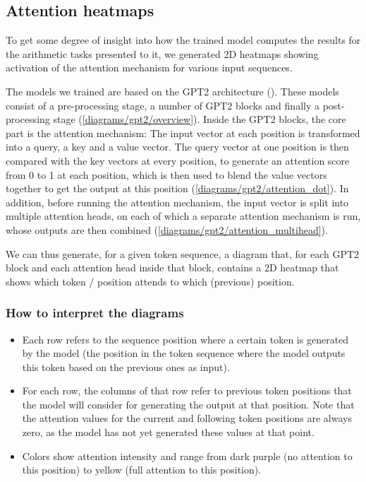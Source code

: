 \subsection{Attention heatmaps}
\label{heatmap}

To get some degree of insight into how the trained model computes the results for the arithmetic tasks presented to it, we generated 2D heatmaps showing activation of the attention mechanism for various input sequences.

The models we trained are based on the GPT2 architecture (\cite{unsupervisedmultitask}). These models consist of a pre-processing stage, a number of GPT2 blocks and finally a post-processing stage (\cref{diagrams/gpt2/overview}). Inside the GPT2 blocks, the core part is the attention mechanism: The input vector at each position is transformed into a query, a key and a value vector. The query vector at one position is then compared with the key vectors at every position, to generate an attention score from 0 to 1 at each position, which is then used to blend the value vectors together to get the output at this position (\cref{diagrams/gpt2/attention_dot}).
In addition, before running the attention mechanism, the input vector is split into multiple attention heads, on each of which a separate attention mechanism is run, whose outputs are then combined (\cref{diagrams/gpt2/attention_multihead}).

We can thus generate, for a given token sequence,
a diagram that, for each GPT2 block and each attention head inside that block, contains a 2D heatmap that shows which token / position attends to which (previous) position.

\subsubsection{How to interpret the diagrams}

\begin{itemize}
    \item Each row refers to the sequence position where a certain token is generated by the model (the position in the token sequence where the model outputs this token based on the previous ones as input).
    
    \item For each row, the columns of that row refer to previous token positions that the model will consider for generating the output at that position. Note that the attention values for the current and following token positions are always zero, as the model has not yet generated these values at that point.
    
    \item Colors show attention intensity and range from dark purple (no attention to this position) to yellow (full attention to this position).
\end{itemize}


